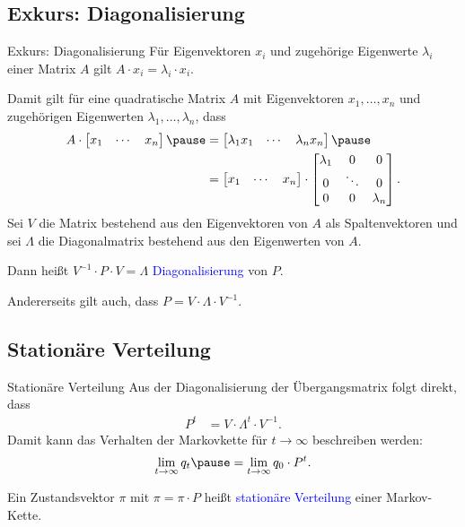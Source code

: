 \documentclass{beamer}
\def\spadding{\vspace{0.25cm}}
\def\b{\textcolor{blue}}
\begin{document}
\subsection{Exkurs: Diagonalisierung}
\begin{frame}{Exkurs: Diagonalisierung}
    Für Eigenvektoren $x_i$ und zugehörige Eigenwerte $\lambda_i$ einer Matrix $A$ gilt $A \cdot x_i = \lambda_i \cdot x_i$.\pause\par\spadding
    Damit gilt für eine quadratische Matrix $A$ mit Eigenvektoren $x_1, \dots, x_n$ und zugehörigen Eigenwerten $\lambda_1, \dots, \lambda_n$\pause, dass
    \begin{align*}
        A \cdot \begin{bmatrix}
            x_1 & \cdots & x_n
        \end{bmatrix}\pause &= \begin{bmatrix}
            \lambda_1 x_1 & \cdots & \lambda_n x_n
        \end{bmatrix}\pause \\
        &= \begin{bmatrix}
            x_1 & \cdots & x_n
        \end{bmatrix} \cdot \begin{bmatrix}
            \lambda_1 & 0 & 0 \\
            0 & \ddots & 0 \\
            0 & 0 & \lambda_n
        \end{bmatrix}.
    \end{align*}\pause
    Sei $V$ die Matrix bestehend aus den Eigenvektoren von $A$ als Spaltenvektoren und sei $\Lambda$ die Diagonalmatrix bestehend aus den Eigenwerten von $A$.\pause\par\spadding
    Dann heißt $V^{-1} \cdot P \cdot V = \Lambda$ \b{Diagonalisierung} von $P$.\pause\par
    Andererseits gilt auch, dass $P = V \cdot \Lambda \cdot V^{-1}$.
\end{frame}

\subsection{Stationäre Verteilung}
\begin{frame}{Stationäre Verteilung}
    Aus der Diagonalisierung der Übergangsmatrix folgt direkt, dass
    \begin{align*}
                                     P^t &= V \cdot \Lambda^t \cdot V^{-1}.
    \end{align*}\pause
    Damit kann das Verhalten der Markovkette für $t \to \infty$ beschreiben werden:
    \begin{align*}
        \lim_{t \to \infty} q_t\pause = \lim_{t \to \infty} q_0 \cdot P^t.
    \end{align*}\pause
    \begin{definition}
        Ein Zustandsvektor $\pi$ mit $\pi = \pi \cdot P$ heißt \b{stationäre Verteilung} einer Markov-Kette.
    \end{definition}
\end{frame}
\end{document}
